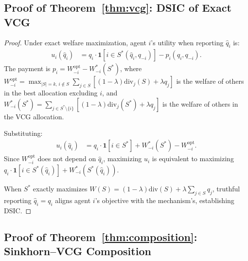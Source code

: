 \documentclass[10pt]{article}
\begin{document}
\subsection{Proof of Theorem~\ref{thm:vcg}: DSIC of Exact VCG}

\begin{proof}
Under exact welfare maximization, agent $i$'s utility when reporting $\hat{q}_i$ is:
\begin{align}
u_i(\hat{q}_i) &= q_i \cdot \mathbf{1}[i \in S^*(\hat{q}_i, q_{-i})] - p_i(\hat{q}_i, q_{-i}).
\end{align}
The payment is $p_i = W_{-i}^{\mathrm{opt}} - W_{-i}^*(S^*)$, where
$W_{-i}^{\mathrm{opt}} = \max_{|S|=k,\, i \notin S} \sum_{j \in S}[(1-\lambda)\mathrm{div}_j(S) + \lambda q_j]$ is the welfare of others in the best allocation excluding $i$, and
$W_{-i}^*(S^*) = \sum_{j \in S^* \setminus \{i\}}[(1-\lambda)\mathrm{div}_j(S^*) + \lambda q_j]$ is the welfare of others in the VCG allocation.

Substituting:
\begin{align}
u_i(\hat{q}_i) &= q_i \cdot \mathbf{1}[i \in S^*] + W_{-i}^*(S^*) - W_{-i}^{\mathrm{opt}}.
\end{align}
Since $W_{-i}^{\mathrm{opt}}$ does not depend on $\hat{q}_i$, maximizing $u_i$ is equivalent to maximizing
$q_i \cdot \mathbf{1}[i \in S^*(\hat{q}_i)] + W_{-i}^*(S^*(\hat{q}_i))$.

When $S^*$ exactly maximizes $W(S) = (1-\lambda)\mathrm{div}(S) + \lambda \sum_{j \in S} q_j$, truthful reporting $\hat{q}_i = q_i$ aligns agent $i$'s objective with the mechanism's, establishing DSIC.
\end{proof}

\subsection{Proof of Theorem~\ref{thm:composition}: Sinkhorn--VCG Composition}
\end{document}
